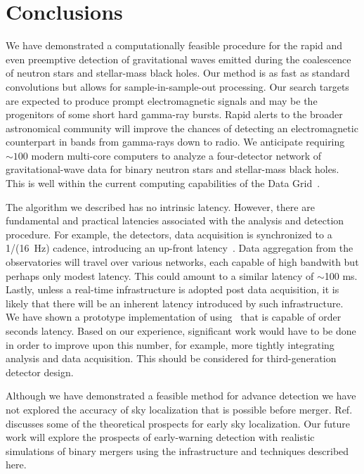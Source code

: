 \section{Conclusions}
\label{SECV}\label{sec:conclusions}

We have demonstrated a computationally feasible procedure for the rapid and even preemptive
detection of gravitational waves emitted during the coalescence of neutron
stars and stellar-mass black holes. Our method is as fast as standard \fft{}
convolutions but allows for sample-in-sample-out processing.
Our search targets are expected to
produce prompt electromagnetic signals and may be the progenitors of some short
hard gamma-ray bursts.  Rapid alerts to the broader astronomical community will
improve the chances of detecting an electromagnetic counterpart in bands from
gamma-rays down to radio.  We anticipate requiring $\sim100$ modern
multi-core computers to analyze a four-detector network of gravitational-wave data
for binary neutron stars and stellar-mass black holes.  This is well within the
current computing capabilities of the \LIGO{} Data Grid~\cite{LDG}.

The algorithm we described has no intrinsic latency.  However, there are
fundamental and practical latencies associated with the analysis and detection
procedure. For example, the \LIGO{} detectors, data acquisition is synchronized
to a 1/(16~Hz) cadence, introducing an up-front latency~\cite{CITE_CDS}. Data
aggregation from
the observatories will travel over various networks, each capable of high
bandwith but perhaps only modest latency.  This could amount to a similar
latency of $\sim$100 ms.  Lastly, unless a real-time infrastructure is adopted
post data acquisition, it is likely that there will be an inherent latency
introduced by such infrastructure.  We have shown a prototype implementation
of \lloid{} using \gstlal\ that is capable of order seconds latency. Based
on our experience, significant work would have to be done in order to improve
upon this number, for example, more tightly integrating analysis and data
acquisition. This should be considered for third-generation detector design.

Although we have demonstrated a feasible method for advance detection we have
not explored the accuracy of sky localization that is possible before merger.
Ref.~\cite{Fairhurst2009} discusses some of the theoretical prospects for early sky
localization.  Our future work will explore the prospects of early-warning
detection with realistic simulations of binary mergers using the infrastructure
and techniques described here. 

